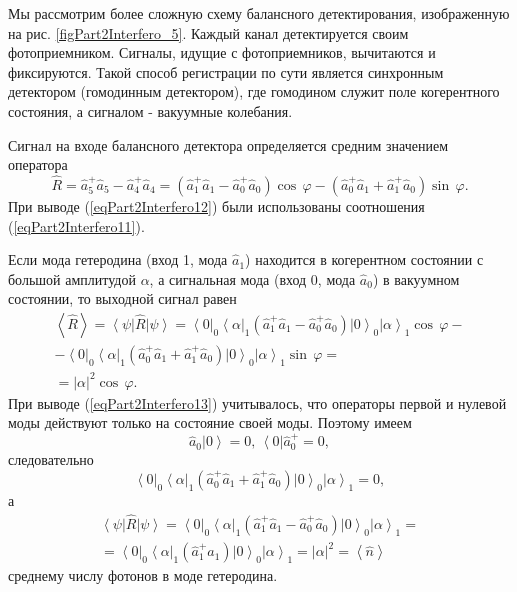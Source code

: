

Мы рассмотрим более сложную схему балансного детектирования,
изображенную на рис. \ref{figPart2Interfero_5}. Каждый канал
детектируется своим фотоприемником. Сигналы, идущие с фотоприемников, 
вычитаются и фиксируются. Такой способ регистрации по сути является
синхронным детектором (гомодинным детектором), где гомодином служит
поле когерентного состояния, а сигналом - вакуумные колебания.

Сигнал на входе балансного детектора определяется средним значением
оператора 
\begin{equation}
\hat{R} = 
\hat{a}_5^{+} \hat{a}_5 - 
\hat{a}_4^{+} \hat{a}_4 =
\left(
\hat{a}_1^{+} \hat{a}_1 - 
\hat{a}_0^{+} \hat{a}_0
\right) \cos\,\varphi -
\left(
\hat{a}_0^{+} \hat{a}_1 + 
\hat{a}_1^{+} \hat{a}_0
\right) \sin\,\varphi.
\label{eqPart2Interfero12}
\end{equation}
При выводе (\ref{eqPart2Interfero12}) были использованы соотношения
(\ref{eqPart2Interfero11}).

Если мода гетеродина (вход 1, мода $\hat{a}_1$) находится в
когерентном состоянии с большой амплитудой $\alpha$, а сигнальная мода
(вход 0, мода $\hat{a}_0$) в вакуумном состоянии, то выходной сигнал
равен
\begin{eqnarray}
\left<\hat{R}\right> = 
\left<\psi\right|\hat{R} \left|\psi\right> = 
\left<0\right|_0\left<\alpha\right|_1
\left(
\hat{a}_1^{+} \hat{a}_1 - 
\hat{a}_0^{+} \hat{a}_0
\right)
\left|0\right>_0\left|\alpha\right>_1
\cos\,\varphi
-
\nonumber \\
-
\left<0\right|_0\left<\alpha\right|_1
\left(
\hat{a}_0^{+} \hat{a}_1 + 
\hat{a}_1^{+} \hat{a}_0
\right) 
\left|0\right>_0\left|\alpha\right>_1
\sin\,\varphi = 
\nonumber \\
= \left|\alpha\right|^2 \cos\,\varphi.
\label{eqPart2Interfero13}
\end{eqnarray}
При выводе (\ref{eqPart2Interfero13}) учитывалось, что операторы
первой и нулевой моды действуют только на состояние своей
моды. Поэтому имеем
\[
\hat{a}_0\left|0\right> = 0, \, 
\left<0\right|\hat{a}_0^{+} = 0,
\]
следовательно 
\[
\left<0\right|_0\left<\alpha\right|_1
\left(
\hat{a}_0^{+} \hat{a}_1 + 
\hat{a}_1^{+} \hat{a}_0
\right) 
\left|0\right>_0\left|\alpha\right>_1 = 0,
\]
а
\begin{eqnarray}
\left<\psi\right|\hat{R} \left|\psi\right>= 
\left<0\right|_0\left<\alpha\right|_1
\left(
\hat{a}_1^{+} \hat{a}_1 - 
\hat{a}_0^{+} \hat{a}_0
\right)
\left|0\right>_0\left|\alpha\right>_1
=
\nonumber \\
=
\left<0\right|_0\left<\alpha\right|_1
\left(
\hat{a}_1^{+} \hat{a}_1
\right)
\left|0\right>_0\left|\alpha\right>_1
= \left|\alpha\right|^2 = 
\left<\hat{n}\right>
\nonumber
\end{eqnarray}
среднему числу фотонов в моде гетеродина.

